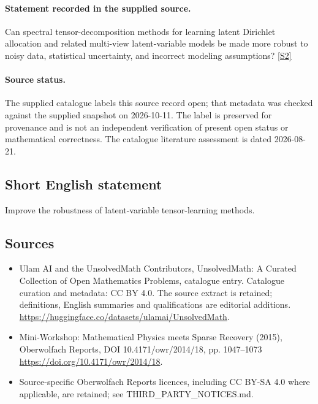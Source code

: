 \documentclass[11pt]{article}
\begin{document}
\paragraph{Statement recorded in the supplied source.}
Can spectral tensor-decomposition methods for learning latent Dirichlet allocation and related multi-view latent-variable models be made more robust to noisy data, statistical uncertainty, and incorrect modeling assumptions? \href{https://doi.org/10.4171/owr/2014/18}{[S2]}
\paragraph{Source status.}
The supplied catalogue labels this source record open; that metadata was checked against the supplied snapshot on 2026-10-11. The label is preserved for provenance and is not an independent verification of present open status or mathematical correctness. The catalogue literature assessment is dated 2026-08-21.
\subsection{Short English statement}
Improve the robustness of latent-variable tensor-learning methods.
\subsection{Sources}
\begin{itemize}
\item[S1] Ulam AI and the UnsolvedMath Contributors, UnsolvedMath: A Curated Collection of Open Mathematics Problems, catalogue entry. Catalogue curation and metadata: CC BY 4.0. The source extract is retained; definitions, English summaries and qualifications are editorial additions.
\url{https://huggingface.co/datasets/ulamai/UnsolvedMath}.
\item[S2] Mini-Workshop: Mathematical Physics meets Sparse Recovery (2015), Oberwolfach Reports, DOI 10.4171/owr/2014/18, pp. 1047--1073
\url{https://doi.org/10.4171/owr/2014/18}.
\item Source-specific Oberwolfach Reports licences, including CC BY-SA 4.0 where applicable, are retained; see THIRD\_PARTY\_NOTICES.md.
\end{itemize}
\end{document}
